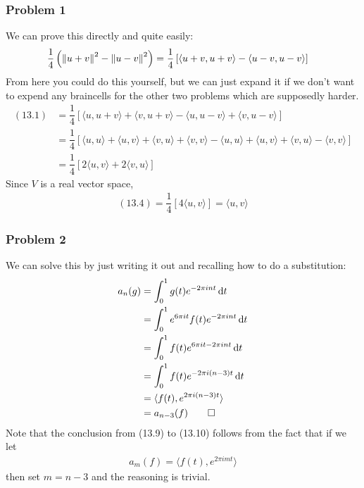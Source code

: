 \subsubsection{Problem 1}
\begin{solution}
    We can prove this directly and quite easily:
    \begin{align}
        \dfrac{1}{4}\left( \norm{u + v}^2 - \norm{u - v}^2 \right) &= \dfrac{1}{4} \left[ \langle u+v,u+v \rangle - \langle u-v,u-v \rangle \right]
    \end{align}
    From here you could do this yourself, but we can just expand it if we don't want to expend any braincells for the other two problems which are supposedly harder.
    \begin{align}
        (13.1) &= \dfrac{1}{4} \left[ \langle u,u+v \rangle + \langle v,u+v \rangle - \langle u,u-v \rangle + \langle v,u-v \rangle \right]\\
        &= \dfrac{1}{4} \left[ \langle u,u \rangle + \langle u,v \rangle + \langle v,u \rangle + \langle v,v \rangle - \langle u,u \rangle + \langle u,v \rangle + \langle v,u \rangle - \langle v,v \rangle \right]\\
        &= \dfrac{1}{4} \left[ 2\langle u,v \rangle + 2\langle v,u \rangle \right]
    \end{align}
    Since $V$ is a real vector space,
    \begin{align}
        (13.4) = \dfrac{1}{4} \left[ 4 \langle u, v \rangle \right] = \langle u, v \rangle
    \end{align}
\end{solution}

\subsubsection{Problem 2}
\begin{solution}
    We can solve this by just writing it out and recalling how to do a substitution:
    \begin{align}
        a_n(g) &= \int_0^1 g(t) e^{-2\pi int} \dd{t}\\
        &= \int_0^1 e^{6\pi it} f(t) e^{-2\pi int} \dd{t}\\
        &= \int_0^1 f(t) e^{6\pi it -2\pi int} \dd{t}\\
        &= \int_0^1 f(t) e^{-2\pi i(n-3)t} \dd{t}\\
        &= \langle f(t), e^{2\pi i (n-3) t} \rangle\\
        &= a_{n-3}(f) \qedhere
    \end{align}
    Note that the conclusion from (13.9) to (13.10) follows from the fact that if we let
    \begin{align}
        a_m(f) = \langle f(t), e^{2\pi imt} \rangle
    \end{align}
    then set $m = n-3$ and the reasoning is trivial.
\end{solution}

